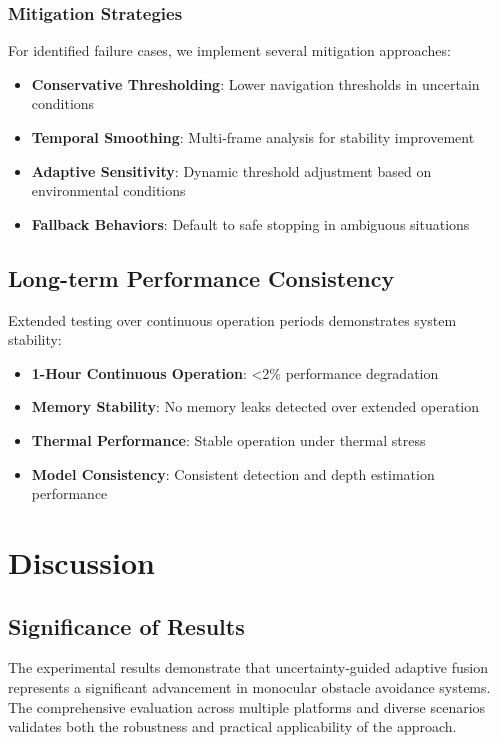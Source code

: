 \documentclass[10pt]{article}
\begin{document}
\subsubsection{Mitigation Strategies}

For identified failure cases, we implement several mitigation approaches:

\begin{itemize}
\item \textbf{Conservative Thresholding}: Lower navigation thresholds in uncertain conditions
\item \textbf{Temporal Smoothing}: Multi-frame analysis for stability improvement
\item \textbf{Adaptive Sensitivity}: Dynamic threshold adjustment based on environmental conditions
\item \textbf{Fallback Behaviors}: Default to safe stopping in ambiguous situations
\end{itemize}

\subsection{Long-term Performance Consistency}

Extended testing over continuous operation periods demonstrates system stability:

\begin{itemize}
\item \textbf{1-Hour Continuous Operation}: <2\% performance degradation
\item \textbf{Memory Stability}: No memory leaks detected over extended operation
\item \textbf{Thermal Performance}: Stable operation under thermal stress
\item \textbf{Model Consistency}: Consistent detection and depth estimation performance
\end{itemize}

\section{Discussion}

\subsection{Significance of Results}

The experimental results demonstrate that uncertainty-guided adaptive fusion represents a significant advancement in monocular obstacle avoidance systems. The comprehensive evaluation across multiple platforms and diverse scenarios validates both the robustness and practical applicability of the approach.
\end{document}
